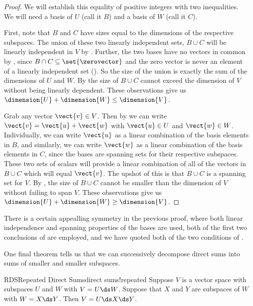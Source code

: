 \begin{proof}
We will establish this equality of positive integers with two inequalities.  We will need a basis of $U$ (call it $B$) and a basis of $W$ (call it $C$).\par
%
First,  note that $B$ and $C$ have sizes equal to the dimensions of the respective subspaces.  The union of these two linearly independent sets, $B\cup C$ will be linearly independent in $V$ by .  Further, the two bases have no vectors in common by , since $B\cap C\subseteq\set{\zerovector}$ and the zero vector is never an element of a linearly independent set ().  So the size of the union is exactly the sum of the dimensions of $U$ and $W$.  By  the size  of $B\cup C$ cannot exceed the dimension of $V$ without being linearly dependent.  These observations give us $\dimension{U}+\dimension{W}\leq\dimension{V}$.\par
%
Grab any vector $\vect{v}\in V$.  Then by  we can write $\vect{v}=\vect{u}+\vect{w}$ with $\vect{u}\in U$ and $\vect{w}\in W$.  Individually, we can write $\vect{u}$ as a linear combination of the basis elements in $B$, and similarly, we can write $\vect{w}$ as a linear combination of the basis elements in $C$, since the bases are spanning sets for their respective subspaces.  These two sets of scalars will provide a linear combination of all of the vectors in $B\cup C$ which will equal $\vect{v}$.  The upshot of this is that $B\cup C$ is a spanning set for $V$.  By , the size of $B\cup C$ cannot be smaller than the dimension of $V$ without failing to span $V$.  These observations give us $\dimension{U}+\dimension{W}\geq\dimension{V}$.
%
\end{proof}
%
There is a certain appealling symmetry in the previous proof, where both linear independence and spanning properties of the bases are used, both of the first two conclusions of  are employed, and we have quoted both of the two conditions of .\par
%
One final theorem tells us that we can successively decompose direct sums into sums of smaller and smaller subspaces.
%
\begin{theorem}{RDS}{Repeated Direct Sums}{direct sums!repeated}
Suppose $V$ is a vector space with subspaces $U$ and $W$ with $V=U\ds W$.  Suppose that $X$ and $Y$ are subspaces of $W$ with $W=X\ds Y$.  Then $V=U\ds X\ds Y$.
\end{theorem}
